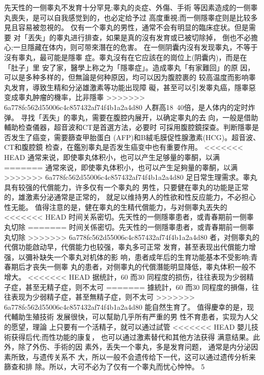 \documentclass[12pt,UTF8]{ctexbook}
\begin{document}
先天性的一侧睾丸不发育十分罕見;睾丸的炎症、外傷、手術
等因素造成的一侧睾丸喪失，是可以自我感觉到的，也必定给予过
高度重視;而一侧隱睾症则是比较多見且容易被忽視的。
仅有一个睾丸的男性，通常不会有明显的臨床症状。但是需要
对「丟失」的睾丸进行排查，如果是真的沒有发育或已被切除掉，
倒也不必擔心;一旦隱藏在体内，则可带來潛在的危害。
在一侧阴囊内沒有发现睾丸，不等于沒有睾丸，最可能是隱睾
症。睾丸沒有在它应該在的崗位上(阴囊内)，而是在「肚子」里
安了家，醫學上称之为「隱睾症」。造成睾丸「有家難回」的原
因，可以是多种多样的，但無論是何种原因，均可以因为腹腔裹的
较高温度而影响睾丸发育，導致生精和分泌雄激素等功能出现障
礙，甚至可以引发睾丸癌，隱睾惡变成睾丸肿瘤的機率，比非隱睾
>>>>>>> 6a778fc562d55006c4c857432af74f4b1a2a4d80
人群高18~40倍，是人体内的定时炸弹。
寻找「丟失」的睾丸，需要在腹腔内展开，以确定睾丸的去
向，一般是借助輔助检查儀器，超音波和CT是首選方法，必要时
可採用腹腔鏡探查。判断隱睾是否发生了癌变，需要篩查甲胎蛋白
(AFP)和B絨毛膜促性腺激素(HCG)。超音波、CT和腹腔鏡
检查，在鑑別睾丸是否发生癌变中也有重要作用。
<<<<<<< HEAD
通常来说，即使睾丸体积小，也可以产生足够量的睾酮，以满
=======
通常來说，即使睾丸体积小，也可以产生足夠量的睾酮，以满
>>>>>>> 6a778fc562d55006c4c857432af74f4b1a2a4d80
足日常生理需求。睾丸具有较强的代償能力，许多仅有一个睾丸的
男性，只要健在睾丸的功能是正常的，雄激素分泌通常是正常的，
就足以维持男人的性欲和性反应能力，不必担心性无能。
值得注意的是，健在睾丸的生精代償能力，与对侧睾丸丟失的
<<<<<<< HEAD
时间关系密切。先天性的一侧隱睾患者，或青春期前一侧睾丸切除
=======
时间关係密切。先天性的一侧隱睾患者，或青春期前一侧睾丸切除
>>>>>>> 6a778fc562d55006c4c857432af74f4b1a2a4d80
者，对侧睾丸的代償功能啟动早，代償能力也较强，睾丸多可正常
发育，甚至表现出代償能力增强，以彌补缺失一个睾丸对机体的影
响，患者成年后的生育功能基本不受影响;青春期后才丧失一侧睾
丸的患者，对侧睾丸的代償潛能明显降低，睾丸体积一般不增大。
<<<<<<< HEAD
据统計，60%
而30%
同程度的损伤，往往表现为少弱精子症，甚至无精子症，则不太可
=======
據統計，60%
而30%
同程度的損傷，往往表现为少弱精子症，甚至無精子症，则不太可
>>>>>>> 6a778fc562d55006c4c857432af74f4b1a2a4d80
能自然生育了。
值得慶幸的是，现代輔助生殖技術
发展很快，可以幫助几乎所有严重的男
性不育患者，实现为人父的愿望，理論
上只要有一个活精子，就可以通过試管
<<<<<<< HEAD
嬰儿技術获得后代;而性功能的康复，
也可以通过激素替代和其他方法获得
满意结果。此外，除了外伤、手術的因
素外，丢失一个睾丸，多是发育问题，
通常是内分泌因素所致，与遗传关系不
大，所以一般不会遗传给下一代，这可以通过遗传分析来篩查和排
除。所以，大可不必为了仅有一个睾丸而忧心忡忡。
5
\end{document}
